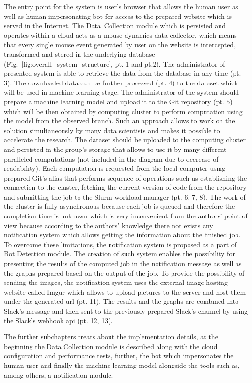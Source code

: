 The entry point for the system is user's browser that allows the human user as well as human impersonating bot for access to the prepared website which is served in the Internet.
The \mbox{Data Collection} module which is persisted and operates within a cloud acts as a mouse dynamics data collector, which means that every single mouse event generated by user on the website is intercepted, transformed and stored in the underlying database (Fig.~\ref{fig:overall_system_structure}, pt. 1 and pt.2).
The administrator of presented system is able to retrieve the data from the database in any time (pt. 3).
The downloaded data can be further processed (pt. 4) to the dataset which will be used in machine learning stage.
The administrator of the system should prepare a machine learning model and upload it to the Git repository (pt. 5) which will be then obtained by computing cluster to perform computation using the model from the observed branch.
Such an approach allows to work on the solution simultaneously by many data scientists and makes it possible to accelerate the research.
The dataset should be uploaded to the computing cluster and persisted in the group's storage that allows to use it by many different paralleled computations (not included in the diagram due to decrease of readability).
Each computation is requested from the local computer using prepared Git's alias that performs sequence of operations such us establishing the connection to the cluster, fetching the current version of code from the repository and submitting the job to the Slurm workload manager (pt. 6, 7, 8).
The work of the cluster is fully asynchronous because each job is queued and therefore the completion time is unknown which is very inconvenient from the authors' point of view because according to the authors' knowledge there not exists any notification system which allows getting the information about the finished job.
To overcome these limitations, the notification system is proposed as a part of Bot Detection module.
The creation of such system enables the possibility for presenting the results of the computed job in the notification message as well as the graphs prepared based on the output of the job.
To provide the possibility of sending the images, the notification system uses the external image hosting website called Imgur which allows to upload pictures to the server and host them under the generated \gls{url} (pt. 11).
The results and the graphs are combined into Slack's message and then sent to the previously prepared Slack's channel by using the Slack's webhook \gls{api} (pt. 12, 13).

The further subchapters treats about the implementation details, at the beginning the Data Collection module is described along with the cloud configuration and performance tests, further, the bot which impersonates the human user and finally the machine learning model alongside the tools such as, among others, a notification module.

